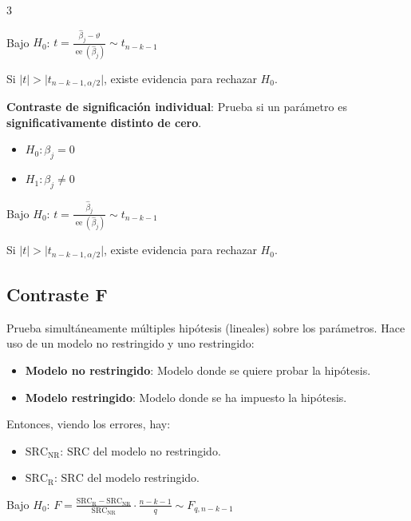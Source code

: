 \documentclass[10pt, a4paper, landscape]{article}
\DeclareMathOperator{\se}{ee}
\newcommand{\SSR}{\text{SRC}}
\begin{document}
\begin{multicols}{3}
\begin{center}
	Bajo \( H_{0} \): \quad \( t = \frac{\hat{\beta}_{j} - \vartheta}{\se(\hat{\beta}_{j})} \sim t_{n - k - 1} \)
\end{center}

Si \( \lvert t \rvert > \lvert t_{n - k - 1, \alpha / 2} \rvert \), existe evidencia para rechazar \( H_{0} \).

\textbf{Contraste de significación individual}: Prueba si un parámetro es \textbf{significativamente distinto de cero}.

\begin{itemize}[leftmargin=*]
	\item \( H_{0}: \beta_{j} = 0 \)
	\item \( H_{1}: \beta_{j} \neq 0 \)
\end{itemize}

\begin{center}
	Bajo \( H_{0} \): \quad \( t = \frac{\hat{\beta}_{j}}{\se(\hat{\beta}_{j})} \sim t_{n - k - 1} \)
\end{center}

Si \( \lvert t \rvert > \lvert t_{n - k - 1, \alpha / 2} \rvert \), existe evidencia para rechazar \( H_{0} \).

\subsection*{Contraste F}

Prueba simultáneamente múltiples hipótesis (lineales) sobre los parámetros. Hace uso de un modelo no restringido y uno restringido:

\begin{itemize}[leftmargin=*]
	\item \textbf{Modelo no restringido}: Modelo donde se quiere probar la hipótesis.
	\item \textbf{Modelo restringido}: Modelo donde se ha impuesto la hipótesis.
\end{itemize}

Entonces, viendo los errores, hay:

\begin{itemize}[leftmargin=*]
	\item \textbf{\( \SSR_{\text{NR}} \)}: \( \SSR \) del modelo no restringido.
	\item \textbf{\( \SSR_{\text{R}} \)}: \( \SSR \) del modelo restringido.
\end{itemize}

\begin{center}
	Bajo \( H_{0} \): \quad \( F = \frac{\SSR_{\text{R}} - \SSR_{\text{NR}}}{\SSR_{\text{NR}}} \cdot \frac{n - k - 1}{q} \sim F_{q, n - k - 1} \)
\end{center}


\end{multicols}
\end{document}
